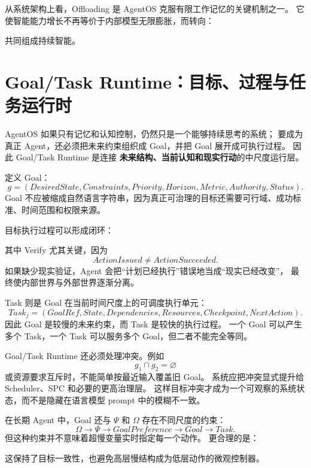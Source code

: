 从系统架构上看，Offloading 是 AgentOS 克服有限工作记忆的关键机制之一。
它使智能能力增长不再等价于内部模型无限膨胀，而转向：
\begin{statementbox}
\centering
{}
\end{statementbox}
共同组成持续智能。


\section{Goal/Task Runtime：目标、过程与任务运行时}

AgentOS 如果只有记忆和认知控制，仍然只是一个能够持续思考的系统；
要成为真正 Agent，还必须把未来约束组织成 Goal，并把 Goal 展开成可执行过程。
因此 Goal/Task Runtime 是连接
\textbf{未来结构、当前认知和现实行动}的中尺度运行层。

定义 Goal：
\[
g=
(
DesiredState,
Constraints,
Priority,
Horizon,
Metric,
Authority,
Status
).
\]
Goal 不应被缩成自然语言字符串，因为真正可治理的目标还需要可行域、成功标准、时间范围和权限来源。

目标执行过程可以形成闭环：
\begin{statementbox}
\centering
{}
\end{statementbox}
其中 Verify 尤其关键，因为
\[
ActionIssued\neq ActionSucceeded.
\]
如果缺少现实验证，Agent 会把``计划已经执行''错误地当成``现实已经改变''，
最终使内部世界与外部世界逐渐分离。

Task 则是 Goal 在当前时间尺度上的可调度执行单元：
\[
Task_j=
(
GoalRef,
State,
Dependencies,
Resources,
Checkpoint,
NextAction
).
\]
因此 Goal 是较慢的未来约束，而 Task 是较快的执行过程。
一个 Goal 可以产生多个 Task，一个 Task 可以服务多个 Goal，但二者不能完全等同。

Goal/Task Runtime 还必须处理冲突。例如
\[
g_1\cap g_2=\varnothing
\]
或资源要求互斥时，不能简单按最近输入覆盖旧 Goal。
系统应把冲突显式提升给 Scheduler、SPC 和必要的更高治理层。
这样目标冲突才成为一个可观察的系统状态，而不是隐藏在语言模型 prompt 中的模糊不一致。

在长期 Agent 中，Goal 还与 $\Psi$ 和 $\Omega$ 存在不同尺度的约束：
\[
\Omega
\rightarrow
\Psi
\rightarrow
GoalPreference
\rightarrow
Goal
\rightarrow
Task.
\]
但这种约束并不意味着超慢变量实时指定每一个动作。
更合理的是：
\begin{statementbox}
\centering
{}
\end{statementbox}
这保持了目标一致性，也避免高层慢结构成为低层动作的微观控制器。


